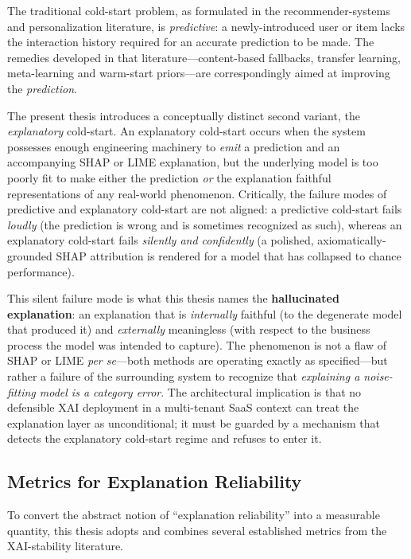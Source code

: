 The traditional cold-start problem, as formulated in the recommender-systems
and personalization literature, is \emph{predictive}: a newly-introduced user
or item lacks the interaction history required for an accurate prediction to
be made. The remedies developed in that literature---content-based fallbacks,
transfer learning, meta-learning and warm-start priors---are correspondingly
aimed at improving the \emph{prediction}.

The present thesis introduces a conceptually distinct second variant, the
\emph{explanatory} cold-start. An explanatory cold-start occurs when the
system possesses enough engineering machinery to \emph{emit} a prediction and
an accompanying SHAP or LIME explanation, but the underlying model is too
poorly fit to make either the prediction \emph{or} the explanation faithful
representations of any real-world phenomenon. Critically, the failure modes of
predictive and explanatory cold-start are not aligned: a predictive cold-start
fails \emph{loudly} (the prediction is wrong and is sometimes recognized as
such), whereas an explanatory cold-start fails \emph{silently and confidently}
(a polished, axiomatically-grounded SHAP attribution is rendered for a model
that has collapsed to chance performance).

This silent failure mode is what this thesis names the \textbf{hallucinated
explanation}: an explanation that is \emph{internally} faithful (to the
degenerate model that produced it) and \emph{externally} meaningless (with
respect to the business process the model was intended to capture). The
phenomenon is not a flaw of SHAP or LIME \emph{per se}---both methods are
operating exactly as specified---but rather a failure of the surrounding
system to recognize that \emph{explaining a noise-fitting model is a category
error}. The architectural implication is that no defensible XAI deployment in
a multi-tenant SaaS context can treat the explanation layer as unconditional;
it must be guarded by a mechanism that detects the explanatory cold-start
regime and refuses to enter it.

\subsection{Metrics for Explanation Reliability}
\label{subsec:metrics}

To convert the abstract notion of ``explanation reliability'' into a
measurable quantity, this thesis adopts and combines several established
metrics from the XAI-stability literature.

